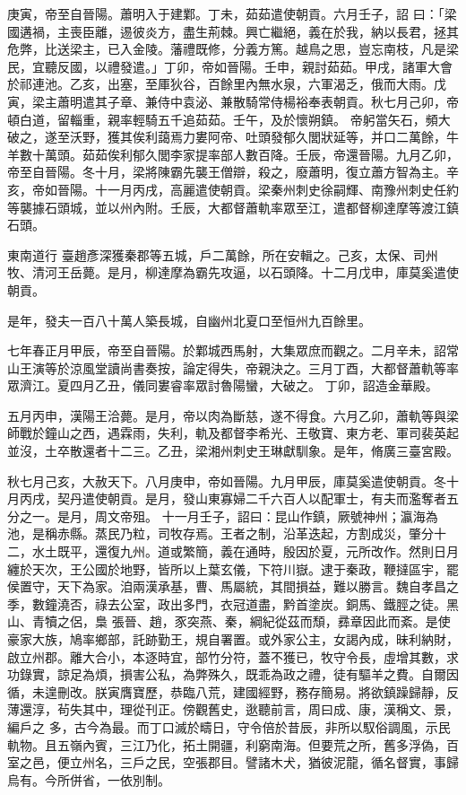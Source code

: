 \begin{pinyinscope}
 庚寅，帝至自晉陽。蕭明入于建鄴。丁未，茹茹遣使朝貢。六月壬子，詔
 曰：「梁國遘禍，主喪臣離，逷彼炎方，盡生荊棘。興亡繼絕，義在於我，納以長君，拯其危弊，比送梁主，已入金陵。藩禮既修，分義方篤。越鳥之思，豈忘南枝，凡是梁民，宜聽反國，以禮發遣。」丁卯，帝如晉陽。壬申，親討茹茹。甲戌，諸軍大會於祁連池。乙亥，出塞，至厙狄谷，百餘里內無水泉，六軍渴乏，俄而大雨。戊寅，梁主蕭明遣其子章、兼侍中袁泌、兼散騎常侍楊裕奉表朝貢。秋七月己卯，帝頓白道，留輜重，親率輕騎五千追茹茹。壬午，及於懷朔鎮。
 帝躬當矢石，頻大破之，遂至沃野，獲其俟利藹焉力婁阿帝、吐頭發郁久閭狀延等，并口二萬餘，牛羊數十萬頭。茹茹俟利郁久閭李家提率部人數百降。壬辰，帝還晉陽。九月乙卯，帝至自晉陽。冬十月，梁將陳霸先襲王僧辯，殺之，廢蕭明，復立蕭方智為主。辛亥，帝如晉陽。十一月丙戌，高麗遣使朝貢。梁秦州刺史徐嗣輝、南豫州刺史任約等襲據石頭城，並以州內附。壬辰，大都督蕭軌率眾至江，遣都督柳達摩等渡江鎮石頭。



 東南道行
 臺趙彥深獲秦郡等五城，戶二萬餘，所在安輯之。己亥，太保、司州牧、清河王岳薨。是月，柳達摩為霸先攻逼，以石頭降。十二月戊申，庫莫奚遣使朝貢。



 是年，發夫一百八十萬人築長城，自幽州北夏口至恒州九百餘里。



 七年春正月甲辰，帝至自晉陽。於鄴城西馬射，大集眾庶而觀之。二月辛未，詔常山王演等於涼風堂讀尚書奏按，論定得失，帝親決之。三月丁酉，大都督蕭軌等率眾濟江。夏四月乙丑，儀同婁睿率眾討魯陽蠻，大破之。
 丁卯，詔造金華殿。



 五月丙申，漢陽王洽薨。是月，帝以肉為斷慈，遂不得食。六月乙卯，蕭軌等與梁師戰於鐘山之西，遇霖雨，失利，軌及都督李希光、王敬寶、東方老、軍司裴英起並沒，土卒散還者十二三。乙丑，梁湘州刺史王琳獻馴象。是年，脩廣三臺宮殿。



 秋七月己亥，大赦天下。八月庚申，帝如晉陽。九月甲辰，庫莫奚遣使朝貢。冬十月丙戌，契丹遣使朝貢。是月，發山東寡婦二千六百人以配軍士，有夫而濫奪者五分之一。是月，周文帝殂。
 十一月壬子，詔曰：昆山作鎮，厥號神州；瀛海為池，是稱赤縣。蒸民乃粒，司牧存焉。王者之制，沿革迭起，方割成災，肇分十二，水土既平，還復九州。道或繁簡，義在通時，殷因於夏，元所改作。然則日月纏於天次，王公國於地野，皆所以上葉玄儀，下符川嶽。逮于秦政，鞭撻區宇，罷侯置守，天下為家。洎兩漢承基，曹、馬屬統，其間損益，難以勝言。魏自孝昌之季，數鐘澆否，祿去公室，政出多門，衣冠道盡，黔首塗炭。銅馬、鐵脛之徒。黑山、青犢之侶，梟
 張晉、趙，豕突燕、秦，綱紀從茲而頹，彞章因此而紊。是使豪家大族，鳩率鄉部，託跡勤王，規自署置。或外家公主，女謁內成，昧利納財，啟立州郡。離大合小，本逐時宜，部竹分符，蓋不獲已，牧守令長，虛增其數，求功錄實，諒足為煩，損害公私，為弊殊久，既乖為政之禮，徒有驅羊之費。自爾因循，未遑刪改。朕寅膺寶歷，恭臨八荒，建國經野，務存簡易。將欲鎮躁歸靜，反薄還淳，茍失其中，理從刊正。傍觀舊史，逖聽前言，周曰成、康，漢稱文、景，編戶之
 多，古今為最。而丁口滅於疇日，守令倍於昔辰，非所以馭俗調風，示民軌物。且五嶺內賓，三江乃化，拓土開疆，利窮南海。但要荒之所，舊多浮偽，百室之邑，便立州名，三戶之民，空張郡目。譬諸木犬，猶彼泥龍，循名督實，事歸烏有。今所併省，一依別制。




\end{pinyinscope}
